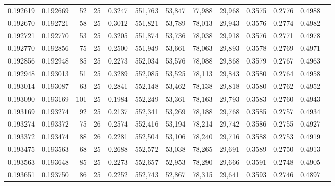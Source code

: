 \begin{tabular}{rrrrrrrrrrrrr}
0.192619 & 0.192669 &    52 &  25 &                                     0.3247 & 551,763 &  53,847 &  77,988 &  29,968 & 0.3575 & 0.2776 & 0.4988 \\
0.192670 & 0.192721 &    58 &  25 &                                     0.3012 & 551,821 &  53,789 &  78,013 &  29,943 & 0.3576 & 0.2774 & 0.4982 \\
0.192721 & 0.192770 &    53 &  25 &                                     0.3205 & 551,874 &  53,736 &  78,038 &  29,918 & 0.3576 & 0.2771 & 0.4978 \\
0.192770 & 0.192856 &    75 &  25 &                                     0.2500 & 551,949 &  53,661 &  78,063 &  29,893 & 0.3578 & 0.2769 & 0.4971 \\
0.192856 & 0.192948 &    85 &  25 &                                     0.2273 & 552,034 &  53,576 &  78,088 &  29,868 & 0.3579 & 0.2767 & 0.4963 \\
0.192948 & 0.193013 &    51 &  25 &                                     0.3289 & 552,085 &  53,525 &  78,113 &  29,843 & 0.3580 & 0.2764 & 0.4958 \\
0.193014 & 0.193087 &    63 &  25 &                                     0.2841 & 552,148 &  53,462 &  78,138 &  29,818 & 0.3580 & 0.2762 & 0.4952 \\
0.193090 & 0.193169 &   101 &  25 &                                     0.1984 & 552,249 &  53,361 &  78,163 &  29,793 & 0.3583 & 0.2760 & 0.4943 \\
0.193169 & 0.193274 &    92 &  25 &                                     0.2137 & 552,341 &  53,269 &  78,188 &  29,768 & 0.3585 & 0.2757 & 0.4934 \\
0.193274 & 0.193372 &    75 &  26 &                                     0.2574 & 552,416 &  53,194 &  78,214 &  29,742 & 0.3586 & 0.2755 & 0.4927 \\
0.193372 & 0.193474 &    88 &  26 &                                     0.2281 & 552,504 &  53,106 &  78,240 &  29,716 & 0.3588 & 0.2753 & 0.4919 \\
0.193475 & 0.193563 &    68 &  25 &                                     0.2688 & 552,572 &  53,038 &  78,265 &  29,691 & 0.3589 & 0.2750 & 0.4913 \\
0.193563 & 0.193648 &    85 &  25 &                                     0.2273 & 552,657 &  52,953 &  78,290 &  29,666 & 0.3591 & 0.2748 & 0.4905 \\
0.193651 & 0.193750 &    86 &  25 &                                     0.2252 & 552,743 &  52,867 &  78,315 &  29,641 & 0.3593 & 0.2746 & 0.4897 \\

\end{tabular}
